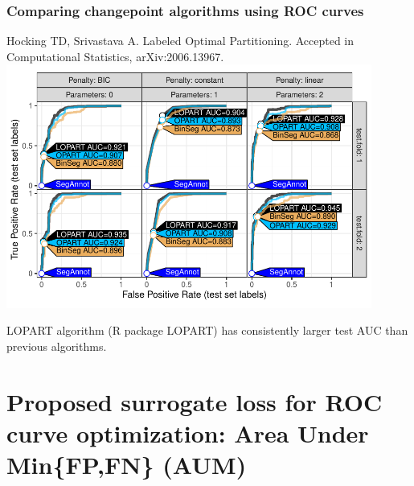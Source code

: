\documentclass[t]{beamer}
\begin{document}
\begin{frame}
  \frametitle{Comparing changepoint algorithms using ROC curves}
  {\scriptsize Hocking TD, Srivastava A. Labeled Optimal Partitioning. Accepted in Computational Statistics, arXiv:2006.13967.}
  \includegraphics[width=0.9\textwidth]{figure-LOPART-roc}

  LOPART algorithm (R package LOPART) has consistently larger
  test AUC than previous algorithms.
\end{frame}

\section{Proposed surrogate loss for ROC curve optimization: Area Under Min\{FP,FN\} (AUM)} 
\end{document}
